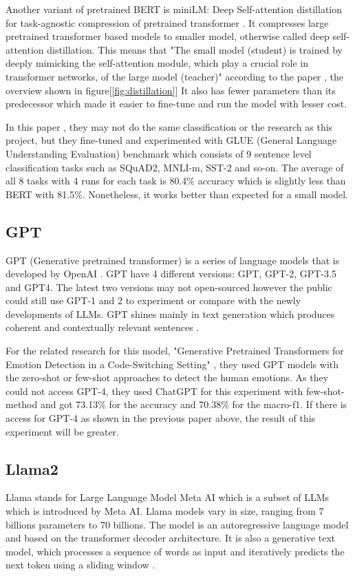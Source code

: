 Another variant of pretrained BERT is miniLM: Deep Self-attention distillation for task-agnostic compression of pretrained transformer \cite{Wang_Wei_Dong_Bao_Yang_Zhou_2020}.
It compresses large pretrained transformer based models to smaller model, otherwise called deep self-attention distillation. This means that "The small model (student) is trained by deeply mimicking the self-attention module, which play a crucial role in transformer networks, of the large model (teacher)" according to the paper \cite{Wang_Wei_Dong_Bao_Yang_Zhou_2020}, the overview shown in figure[\ref{fig:distillation}]
It also has fewer parameters than its predecessor which made it easier to fine-tune and run the model with lesser cost. 

In this paper \cite{Wang_Wei_Dong_Bao_Yang_Zhou_2020}, they may not do the same classification or the research as this project, but they fine-tuned and experimented with GLUE (General Language Understanding Evaluation) benchmark which consists of 9 sentence level classification tasks such as SQuAD2, MNLI-m, SST-2 and so-on. The average of all 8 tasks with 4 runs for each task is 80.4\% accuracy which is slightly less than BERT with 81.5\%. Nonetheless, it works better than expected for a small model.

\subsection{GPT}
 GPT (Generative pretrained transformer) is a series of language models that is developed by OpenAI \cite{Jorge_2023}. GPT have 4 different versions: GPT, GPT-2, GPT-3.5 and GPT4. The latest two versions may not open-sourced however the public could still use GPT-1 and 2 to experiment or compare with the newly developments of LLMs. GPT shines mainly in text generation which produces coherent and contextually relevant sentences \cite{Jorge_2023}.
 
 For the related research for this model, "Generative Pretrained Transformers for Emotion Detection in a Code-Switching Setting" \cite{Nedilko}, they used GPT models with the zero-shot or few-shot approaches to detect the human emotions. As they could not access GPT-4, they used ChatGPT for this experiment with few-shot-method and got 73.13\% for the accuracy and 70.38\% for the macro-f1. If there is access for GPT-4 as shown in the previous paper above, the result of this experiment will be greater.

 \subsection{Llama2}
Llama stands for Large Language Model Meta AI which is a subset of LLMs which is introduced by Meta AI. Llama models vary in size, ranging from 7 billions parameters to 70 billions. The model is an autoregressive language model and based on the transformer decoder architecture. It is also a generative text model, which processes a sequence of words as input and iteratively predicts the next token using a sliding window \cite{Iraqi_2023}.

